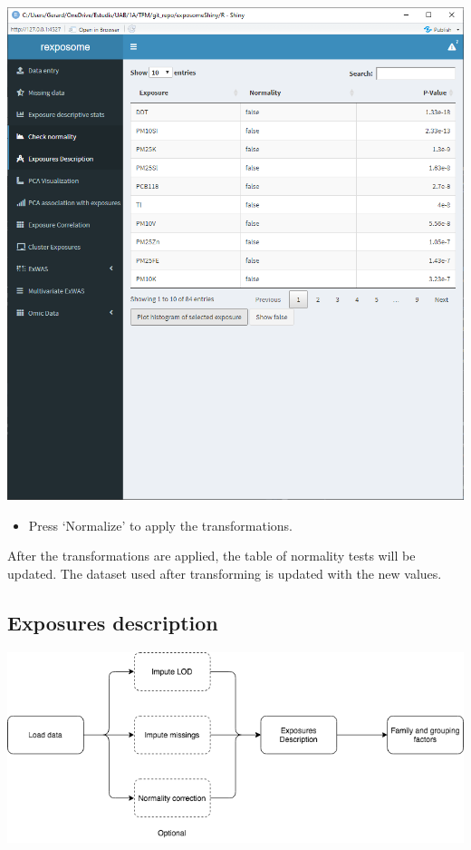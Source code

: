 \documentclass[
]{book}
\providecommand{\tightlist}{%
  \setlength{\itemsep}{0pt}\setlength{\parskip}{0pt}}
\begin{document}
\includegraphics{images/analysis3_2.png}

\begin{itemize}
\tightlist
\item
  Press `Normalize' to apply the transformations.
\end{itemize}

After the transformations are applied, the table of normality tests will be updated. The dataset used after transforming is updated with the new values.

\hypertarget{exposures-description-1}{%
\subsection{Exposures description}\label{exposures-description-1}}

\includegraphics{images/analysis4_1.png}
\end{document}
